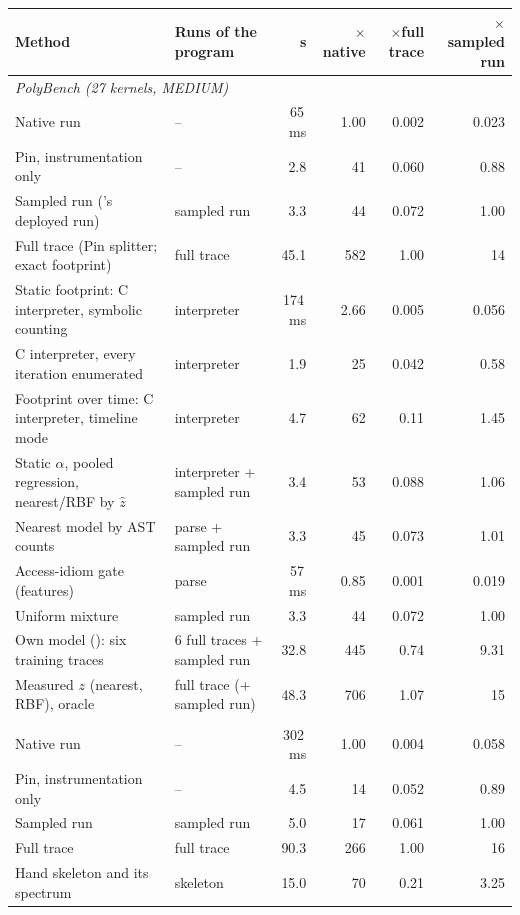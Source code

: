\begin{tabular}{llrrrr}
\toprule
Method & Runs of the program & s & $\times$native & $\times$full trace & $\times$sampled run \\
\midrule
\multicolumn{6}{l}{\textit{PolyBench (27 kernels, MEDIUM)}} \\
\quad Native run & -- & 65\,ms & 1.00 & 0.002 & 0.023 \\
\quad Pin, instrumentation only & -- & 2.8 & 41 & 0.060 & 0.88 \\
\quad Sampled run (\memprint{}'s deployed run) & sampled run & 3.3 & 44 & 0.072 & 1.00 \\
\quad Full trace (Pin splitter; exact footprint) & full trace & 45.1 & 582 & 1.00 & 14 \\
\quad Static footprint: C interpreter, symbolic counting & interpreter & 174\,ms & 2.66 & 0.005 & 0.056 \\
\quad C interpreter, every iteration enumerated & interpreter & 1.9 & 25 & 0.042 & 0.58 \\
\quad Footprint over time: C interpreter, timeline mode & interpreter & 4.7 & 62 & 0.11 & 1.45 \\
\quad Static $\alpha$, pooled regression, nearest/RBF by $\hat z$ & interpreter + sampled run & 3.4 & 53 & 0.088 & 1.06 \\
\quad Nearest model by AST counts & parse + sampled run & 3.3 & 45 & 0.073 & 1.01 \\
\quad Access-idiom gate (features) & parse & 57\,ms & 0.85 & 0.001 & 0.019 \\
\quad Uniform mixture & sampled run & 3.3 & 44 & 0.072 & 1.00 \\
\quad Own model (\memprint{}): six training traces & 6 full traces + sampled run & 32.8 & 445 & 0.74 & 9.31 \\
\quad Measured $z$ (nearest, RBF), oracle & full trace (+ sampled run) & 48.3 & 706 & 1.07 & 15 \\
\addlinespace
\multicolumn{6}{l}{\textit{GAP (12 workloads, scale 16)}} \\
\quad Native run & -- & 302\,ms & 1.00 & 0.004 & 0.058 \\
\quad Pin, instrumentation only & -- & 4.5 & 14 & 0.052 & 0.89 \\
\quad Sampled run & sampled run & 5.0 & 17 & 0.061 & 1.00 \\
\quad Full trace & full trace & 90.3 & 266 & 1.00 & 16 \\
\quad Hand skeleton and its spectrum & skeleton & 15.0 & 70 & 0.21 & 3.25 \\

\end{tabular}
